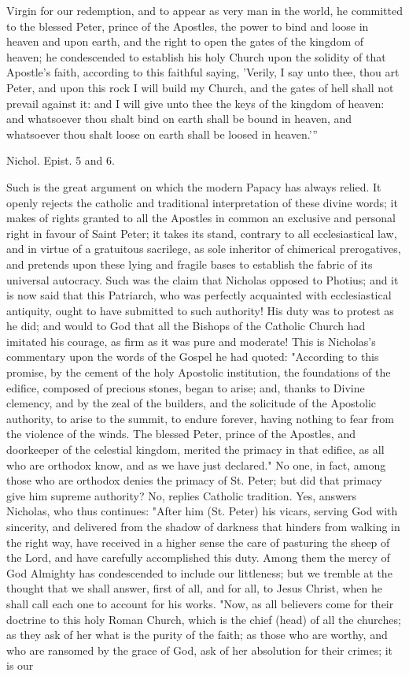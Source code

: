Virgin for our redemption, and to appear as very man in the world, he committed to the blessed Peter, prince of the Apostles, the power to bind and loose in heaven and upon earth, and the right to open the gates of the kingdom of heaven; he condescended to establish his holy Church upon the solidity of that Apostle's faith, according to this faithful saying, 'Verily, I say unto thee, thou art Peter, and upon this rock I will build my Church, and the gates of hell shall not prevail against it: and I will give unto thee the keys of the kingdom of heaven: and whatsoever thou shalt bind on earth shall be bound in heaven, and whatsoever thou shalt loose on earth shall be loosed in heaven.’”

Nichol. Epist. 5 and 6.

Such is the great argument on which the modern Papacy has always relied. It openly rejects the catholic and traditional interpretation of these divine words; it makes of rights granted to all the Apostles in common an exclusive and personal right in favour of Saint Peter; it takes its stand, contrary to all ecclesiastical law, and in virtue of a gratuitous sacrilege, as sole inheritor of chimerical prerogatives, and pretends upon these lying and fragile bases to establish the fabric of its universal autocracy. Such was the claim that Nicholas opposed to Photius; and it is now said that this Patriarch, who was perfectly acquainted with ecclesiastical antiquity, ought to have submitted to such authority! His duty was to protest as he did; and would to God that all the Bishops of the Catholic Church had imitated his courage, as firm as it was pure and moderate! This is Nicholas's commentary upon the words of the Gospel he had quoted: "According to this promise, by the cement of the holy Apostolic institution, the foundations of the edifice, composed of precious stones, began to arise; and, thanks to Divine clemency, and by the zeal of the builders, and the solicitude of the Apostolic authority, to arise to the summit, to endure forever, having nothing to fear from the violence of the winds. The blessed Peter, prince of the Apostles, and doorkeeper of the celestial kingdom, merited the primacy in that edifice, as all who are orthodox know, and as we have just declared." No one, in fact, among those who are orthodox denies the primacy of St. Peter; but did that primacy give him supreme authority? No, replies Catholic tradition. Yes, answers Nicholas, who thus continues: "After him (St. Peter) his vicars, serving God with sincerity, and delivered from the shadow of darkness that hinders from walking in the right way, have received in a higher sense the care of pasturing the sheep of the Lord, and have carefully accomplished this duty. Among them the mercy of God Almighty has condescended to include our littleness; but we tremble at the thought that we shall answer, first of all, and for all, to Jesus Christ, when he shall call each one to account for his works. "Now, as all believers come for their doctrine to this holy Roman Church, which is the chief (head) of all the churches; as they ask of her what is the purity of the faith; as those who are worthy, and who are ransomed by the grace of God, ask of her absolution for their crimes; it is our 